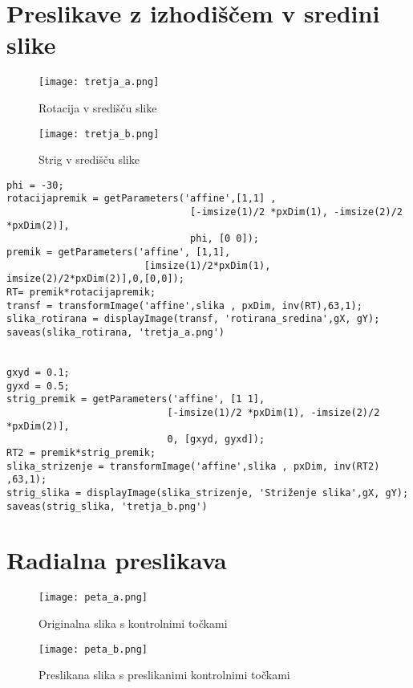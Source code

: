 \documentclass[12pt,a4paper]{article}
\begin{document}
\section{Preslikave z izhodiščem v sredini slike}
\begin{figure}[h!]
  \begin{center}
    \texttt{[image: tretja\_a.png]}
    \caption{Rotacija v središču slike}
  \end{center}
\end{figure}
\begin{figure}[h!]
  \begin{center}
    \texttt{[image: tretja\_b.png]}
    \caption{Strig v središču slike}
  \end{center}
\end{figure}
\pagebreak
\begin{verbatim}
phi = -30;
rotacijapremik = getParameters('affine',[1,1] , 
                                [-imsize(1)/2 *pxDim(1), -imsize(2)/2 *pxDim(2)], 
                                phi, [0 0]);
premik = getParameters('affine', [1,1], 
                        [imsize(1)/2*pxDim(1), imsize(2)/2*pxDim(2)],0,[0,0]);
RT= premik*rotacijapremik;
transf = transformImage('affine',slika , pxDim, inv(RT),63,1);
slika_rotirana = displayImage(transf, 'rotirana_sredina',gX, gY);
saveas(slika_rotirana, 'tretja_a.png')


gxyd = 0.1;
gyxd = 0.5;
strig_premik = getParameters('affine', [1 1], 
                            [-imsize(1)/2 *pxDim(1), -imsize(2)/2 *pxDim(2)], 
                            0, [gxyd, gyxd]);
RT2 = premik*strig_premik;
slika_strizenje = transformImage('affine',slika , pxDim, inv(RT2) ,63,1);
strig_slika = displayImage(slika_strizenje, 'Striženje slika',gX, gY);
saveas(strig_slika, 'tretja_b.png')
\end{verbatim}
\section{Radialna preslikava}
\begin{figure}[h!]
  \begin{center}
    \texttt{[image: peta\_a.png]}
    \caption{Originalna slika s kontrolnimi točkami}
  \end{center}
\end{figure}
\pagebreak
\begin{figure}[h!]
  \begin{center}
    \texttt{[image: peta\_b.png]}
    \caption{Preslikana slika s preslikanimi kontrolnimi točkami}
  \end{center}
\end{figure}
\end{document}
